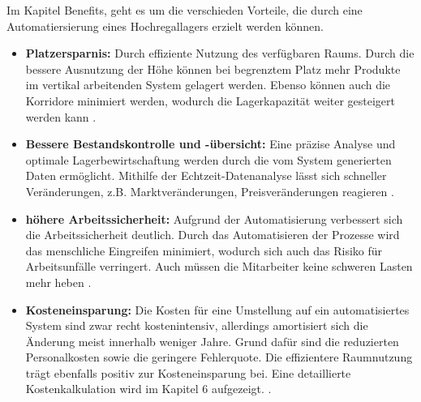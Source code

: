 Im Kapitel Benefits, geht es um die verschieden Vorteile, die durch eine Automatiersierung eines Hochregallagers erzielt werden können.
\begin{itemize}
	\item \textbf{Platzersparnis:}
	Durch effiziente Nutzung des verfügbaren Raums. Durch die bessere Ausnutzung der Höhe können bei begrenztem Platz mehr Produkte im vertikal arbeitenden System gelagert werden. Ebenso können auch die Korridore minimiert werden, wodurch die Lagerkapazität weiter gesteigert werden kann
	\autocite{frazelle2002}.
	\item \textbf{Bessere Bestandskontrolle und -übersicht:}
	Eine präzise Analyse und optimale Lagerbewirtschaftung werden durch die vom System generierten Daten ermöglicht. Mithilfe der Echtzeit-Datenanalyse lässt sich schneller Veränderungen, z.B. Marktveränderungen, Preisveränderungen reagieren \autocite{Gunasekaran2015}.
	\item \textbf{höhere Arbeitssicherheit:}
	Aufgrund der Automatisierung verbessert sich die Arbeitssicherheit deutlich. Durch das Automatisieren der Prozesse wird das menschliche Eingreifen minimiert, wodurch sich auch das Risiko für Arbeitsunfälle verringert. Auch müssen die Mitarbeiter keine schweren Lasten mehr heben \autocite{kelle2019safety}.
	\item \textbf{Kosteneinsparung:}
	Die Kosten für eine Umstellung auf ein automatisiertes System sind zwar recht kostenintensiv, allerdings amortisiert sich die Änderung meist innerhalb weniger Jahre. Grund dafür sind die reduzierten Personalkosten sowie die geringere Fehlerquote. Die effizientere Raumnutzung trägt ebenfalls positiv zur Kosteneinsparung bei. Eine detaillierte Kostenkalkulation wird im Kapitel 6 aufgezeigt. \autocite{mueller2023}.
	
\end{itemize}